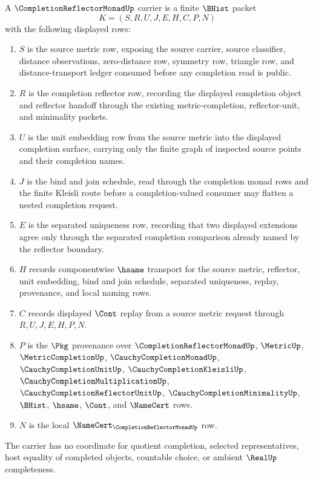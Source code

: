 \begin{definition}
\label{def:completion-reflector-monad-carrier}
A $\CompletionReflectorMonadUp$ carrier is a finite $\BHist$ packet
$$
K=(S,R,U,J,E,H,C,P,N)
$$
with the following displayed rows:
\begin{enumerate}
\item $S$ is the source metric row, exposing the source carrier, source classifier, distance observations, zero-distance row, symmetry row, triangle row, and distance-transport ledger consumed before any completion read is public.
\item $R$ is the completion reflector row, recording the displayed completion object and reflector handoff through the existing metric-completion, reflector-unit, and minimality packets.
\item $U$ is the unit embedding row from the source metric into the displayed completion surface, carrying only the finite graph of inspected source points and their completion names.
\item $J$ is the bind and join schedule, read through the completion monad rows and the finite Kleisli route before a completion-valued consumer may flatten a nested completion request.
\item $E$ is the separated uniqueness row, recording that two displayed extensions agree only through the separated completion comparison already named by the reflector boundary.
\item $H$ records componentwise $\hsame$ transport for the source metric, reflector, unit embedding, bind and join schedule, separated uniqueness, replay, provenance, and local naming rows.
\item $C$ records displayed $\Cont$ replay from a source metric request through $R,U,J,E,H,P,N$.
\item $P$ is the $\Pkg$ provenance over $\CompletionReflectorMonadUp$, $\MetricUp$, $\MetricCompletionUp$, $\CauchyCompletionMonadUp$, $\CauchyCompletionUnitUp$, $\CauchyCompletionKleisliUp$, $\CauchyCompletionMultiplicationUp$, $\CauchyCompletionReflectorUnitUp$, $\CauchyCompletionMinimalityUp$, $\BHist$, $\hsame$, $\Cont$, and $\NameCert$ rows.
\item $N$ is the local $\NameCert_{\CompletionReflectorMonadUp}$ row.
\end{enumerate}
The carrier has no coordinate for quotient completion, selected representatives, host equality of completed objects, countable choice, or ambient $\RealUp$ completeness.
\end{definition}

